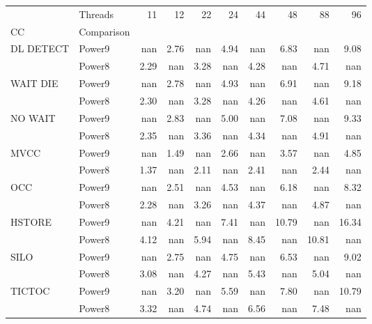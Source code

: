 \begin{tabular}{llrrrrrrrr}
\toprule
       & Threads &   11 &   12 &   22 &   24 &   44 &    48 &    88 &    96 \\
CC & Comparison &      &      &      &      &      &       &       &       \\
\midrule
DL DETECT & Power9 &  nan & 2.76 &  nan & 4.94 &  nan &  6.83 &   nan &  9.08 \\
       & Power8 & 2.29 &  nan & 3.28 &  nan & 4.28 &   nan &  4.71 &   nan \\
WAIT DIE & Power9 &  nan & 2.78 &  nan & 4.93 &  nan &  6.91 &   nan &  9.18 \\
       & Power8 & 2.30 &  nan & 3.28 &  nan & 4.26 &   nan &  4.61 &   nan \\
NO WAIT & Power9 &  nan & 2.83 &  nan & 5.00 &  nan &  7.08 &   nan &  9.33 \\
       & Power8 & 2.35 &  nan & 3.36 &  nan & 4.34 &   nan &  4.91 &   nan \\
MVCC & Power9 &  nan & 1.49 &  nan & 2.66 &  nan &  3.57 &   nan &  4.85 \\
       & Power8 & 1.37 &  nan & 2.11 &  nan & 2.41 &   nan &  2.44 &   nan \\
OCC & Power9 &  nan & 2.51 &  nan & 4.53 &  nan &  6.18 &   nan &  8.32 \\
       & Power8 & 2.28 &  nan & 3.26 &  nan & 4.37 &   nan &  4.87 &   nan \\
HSTORE & Power9 &  nan & 4.21 &  nan & 7.41 &  nan & 10.79 &   nan & 16.34 \\
       & Power8 & 4.12 &  nan & 5.94 &  nan & 8.45 &   nan & 10.81 &   nan \\
SILO & Power9 &  nan & 2.75 &  nan & 4.75 &  nan &  6.53 &   nan &  9.02 \\
       & Power8 & 3.08 &  nan & 4.27 &  nan & 5.43 &   nan &  5.04 &   nan \\
TICTOC & Power9 &  nan & 3.20 &  nan & 5.59 &  nan &  7.80 &   nan & 10.79 \\
       & Power8 & 3.32 &  nan & 4.74 &  nan & 6.56 &   nan &  7.48 &   nan \\
\bottomrule
\end{tabular}
